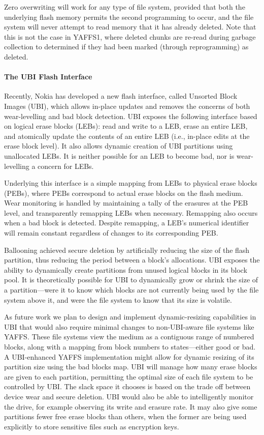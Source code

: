 \documentclass{acmtog}
\begin{document}
Zero overwriting will work for any type of file system, provided that both  the
underlying flash memory permits the second programming to occur, and the file
system will never attempt to read memory that it has already deleted. Note
that this is not the case in YAFFS1, where deleted chunks are re-read during
garbage collection to determined
if they had been marked (through reprogramming) as deleted.

\paragraph{The UBI Flash Interface}
\label{s:ubi}
Recently, Nokia has developed a new flash interface, called
Unsorted Block Images (UBI), which allows
in-place updates and removes the concerns of both wear-levelling and bad block
detection.
UBI exposes the following interface based on logical erase blocks (LEBs): read and write to a LEB, erase an
entire LEB, and atomically update the contents of an entire LEB (i.e.,
in-place edits at the erase block level).
It also allows dynamic creation of UBI partitions using unallocated
LEBs. It is neither possible for an LEB to become bad, nor is wear-levelling a
concern for LEBs.

Underlying this interface is a simple mapping from LEBs to physical erase
blocks (PEBs), where PEBs correspond to actual erase blocks on the flash
medium. Wear
monitoring is handled by maintaining a tally of the erasures at the PEB level, and
transparently remapping LEBs when necessary. Remapping also occurs  when a bad block is
detected.
Despite remapping, a LEB's numerical identifier will remain constant regardless of changes to its corresponding
PEB.


Ballooning achieved secure deletion by artificially
reducing the size of the flash partition, thus reducing the period between a
block's allocations. UBI exposes the ability to dynamically create partitions from unused
logical blocks in its block pool. It is theoretically possible for UBI to dynamically grow
or shrink the size of a partition---were it to know which blocks are not
currently being used by the file system above it, and were the file system to
know that its size is volatile.

As future work we plan to design and implement
dynamic-resizing capabilities in UBI that would also require minimal changes to
non-UBI-aware file
systems like YAFFS. These file systems view the medium as a contiguous range of
numbered blocks, along with a mapping from block numbers to states---either good
or bad. 
A UBI-enhanced YAFFS implementation might allow for dynamic resizing of its
partition size using the bad blocks map. UBI will manage how many erase blocks are given to each
partition, permitting the optimal size of
each file system to be controlled by UBI. The slack space it chooses is based
on the trade off between device wear and secure deletion. UBI would also be
able to intelligently monitor the drive, for example observing its write and erasure rate.
It may also give some partitions fewer free erase blocks than others, when
the former are being used explicitly to store sensitive files such as  encryption keys. 


\newpage



\end{document}
